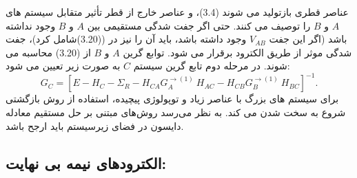 عناصر قطری بازتولید می شوند (3.4)، و عناصر خارج از قطر تأثیر متقابل سیستم های $A$ و $B$ را توصیف می کنند. حتی اگر جفت شدگی مستقیمی بین $A$ و $B$ وجود نداشته باشد (اگر این جفت $V_{AB}$ وجود داشته باشد، باید آن را نیز در ((3.20)شامل کرد)، جفت شدگی موثر از طریق الکترود برقرار می شود.
توابع گرین $A$ و $B$ از (3.20) محاسبه می شوند. در مرحله دوم تابع گرین سیستم $C$ به صورت زیر تعیین می شود:
\begin{equation}
    {{G}_{C}}={{\left[ E-{{H}_{C}}-{{\Sigma }_{R}}-{{H}_{CA}}G_{A}^{\to (1)}\ {{H}_{AC}}-{{H}_{CB}}G_{B}^{\to (1)}\ {{H}_{BC}} \right]}^{-1}}.
\end{equation}
برای سیستم های بزرگ با عناصر زیاد و توپولوژی پیچیده، استفاده از روش بازگشتی شروع به سخت شدن می کند. به نظر می‌رسد روش‌های مبتنی بر حل مستقیم معادله دایسون در فضای زیرسیستم باید ارجح باشد. 

\subsection*{الکترودهای نیمه بی نهایت:}
